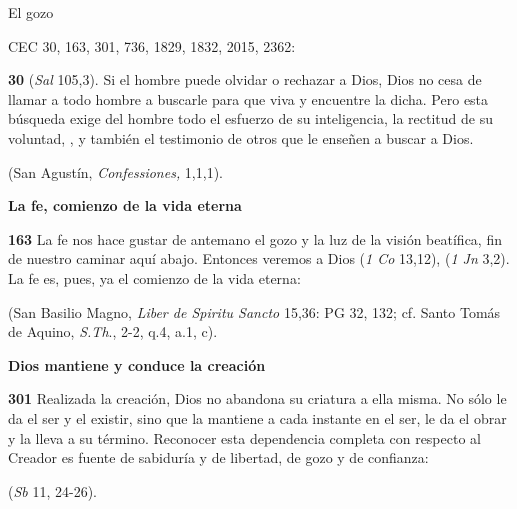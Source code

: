 El gozo

CEC 30, 163, 301, 736, 1829, 1832, 2015, 2362:

\textbf{30}  (\emph{Sal} 105,3). Si el hombre puede olvidar o rechazar a Dios, Dios no cesa de llamar a todo hombre a buscarle para que viva y encuentre la dicha. Pero esta búsqueda exige del hombre todo el esfuerzo de su inteligencia, la rectitud de su voluntad, , y también el testimonio de otros que le enseñen a buscar a Dios.

 (San Agustín, \emph{Confessiones,} 1,1,1).

\textbf{La fe, comienzo de la vida eterna}

\textbf{163} La fe nos hace gustar de antemano el gozo y la luz de la visión beatífica, fin de nuestro caminar aquí abajo. Entonces veremos a Dios  (\emph{1 Co} 13,12),  (\emph{1 Jn} 3,2). La fe es, pues, ya el comienzo de la vida eterna:

 (San Basilio Magno, \emph{Liber de Spiritu Sancto} 15,36: PG 32, 132; cf. Santo Tomás de Aquino, \emph{S.Th}., 2-2, q.4, a.1, c).

\textbf{Dios mantiene y conduce la creación}

\textbf{301} Realizada la creación, Dios no abandona su criatura a ella misma. No sólo le da el ser y el existir, sino que la mantiene a cada instante en el ser, le da el obrar y la lleva a su término. Reconocer esta dependencia completa con respecto al Creador es fuente de sabiduría y de libertad, de gozo y de confianza:

 (\emph{Sb} 11, 24-26).


